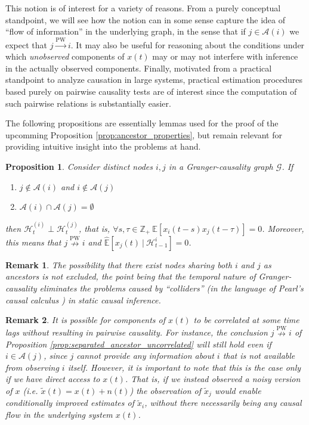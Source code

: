 \documentclass{statsoc}
\def\pwgc{\overset{\text{PW}}{\rightarrow}}  %
\def\npwgc{\overset{\text{PW}}{\nrightarrow}}  %
\def\gcg{\mathcal{G}}  %
\def\H{\mathcal{H}}  %
\newcommand{\linE}[2]{\hat{\E}[#1\ |\ #2]}  %
\newcommand{\anc}[1]{\mathcal{A}(#1)}  %
\newtheorem{proposition}{Proposition}
\newtheorem{remark}{Remark}
\def\H{\mathcal{H}}  %
\def\E{\mathbb{E}}  %
\def\Z{\mathbb{Z}}  %
\begin{document}
This notion is of interest for a variety of reasons.  From a purely
conceptual standpoint, we will see how the notion can in some sense
capture the idea of ``flow of information'' in the underlying graph,
in the sense that if $j \in \anc{i}$ we expect that $j \pwgc i$.  It may
also be useful for reasoning about the conditions under which
\textit{unobserved} components of $x(t)$ may or may not interfere with
inference in the actually observed components.  Finally, motivated
from a practical standpoint to analyze causation in large systems,
practical estimation procedures based purely on pairwise causality
tests are of interest since the computation of such pairwise relations
is substantially easier.

The following propositions are essentially lemmas used for the proof
of the upcomming Proposition \ref{prop:ancestor_properties}, but
remain relevant for providing intuitive insight into the problems at
hand.

\begin{proposition}
  Consider distinct nodes $i, j$ in a Granger-causality graph
  $\gcg$.  If

  \begin{enumerate}[label=(\alph*)]
    \item{$j \not\in \anc{i}$ and $i \not\in \anc{j}$}
    \item{$\anc{i}\cap\anc{j} = \emptyset$}
  \end{enumerate}

  then $\H_t^{(i)} \perp \H_t^{(j)}$, that is,
  $\forall s, \tau \in \Z_+\ \E[x_i(t - s)x_j(t - \tau)] = 0$.  Moreover,
  this means that $j \npwgc i$ and $\linE{x_j(t)}{\H_{t - 1}^i} = 0$.
\end{proposition}

\begin{remark}
  The possibility that there exist nodes sharing both $i$ and $j$ as
  ancestors is not excluded, the point being that the temporal nature
  of Granger-causality eliminates the problems caused by ``colliders''
  (in the language of Pearl's causal calculus
  \cite{pearl2009causality}) in static causal inference.
\end{remark}

\begin{remark}
  It is possible for components of $x(t)$ to be correlated at some
  time lags without resulting in pairwise causality.  For instance,
  the conclusion $j \npwgc i$ of Proposition
  \ref{prop:separated_ancestor_uncorrelated} will still hold even if
  $i \in \anc{j}$, since $j$ cannot provide any information about $i$
  that is not available from observing $i$ itself.  However, it is
  important to note that this is the case only if we have direct
  access to $x(t)$.  That is, if we instead observed a noisy version
  of $x$ (i.e. $\tilde{x}(t) = x(t) + n(t)$) the observation of
  $\tilde{x}_j$ would enable conditionally improved estimates of
  $\tilde{x}_i$, without there necessarily being any causal flow in
  the underlying system $x(t)$.
\end{remark}
\end{document}
